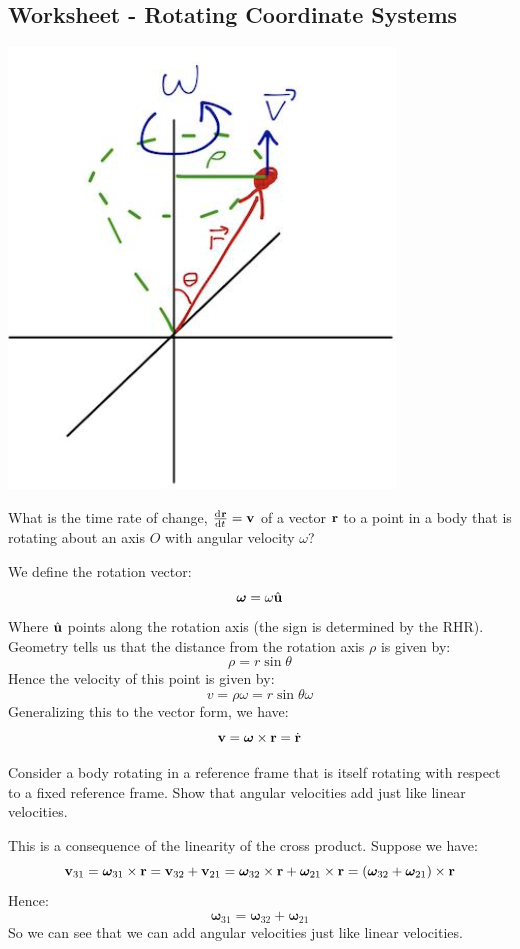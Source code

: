 \subsection{Worksheet - Rotating Coordinate Systems}
\begin{center}
    \includegraphics[scale=0.75]{Lecture-15/w15-img1.png}
\end{center}
\begin{p}
What is the time rate of change, $\od{\v{r}}{t} = \v{v}$ of a vector $\mathbf{r}$ to a point in a body that is rotating about an axis $O$ with angular velocity $\omega$?
\end{p}
\begin{s}
We define the rotation vector:
\[\bm{\omega} = \omega\hat{\mathbf{u}}\]
Where $\hat{\mathbf{u}}$ points along the rotation axis (the sign is determined by the RHR). Geometry tells us that the distance from the rotation axis $\rho$ is given by:
\[\rho = r\sin\theta\]
Hence the velocity of this point is given by:
\[v = \rho\omega = r\sin\theta\omega\]
Generalizing this to the vector form, we have:
\[\mathbf{v} = \bm{\omega} \times \mathbf{r} = \dot{\mathbf{r}}\]
\end{s}

\begin{p}
Consider a body rotating in a reference frame that is itself rotating with respect to a fixed reference frame. Show that angular velocities add just like linear velocities.
\end{p}
\begin{s}
This is a consequence of the linearity of the cross product. Suppose we have:
\[\mathbf{v}_{31} = \bm{\omega}_{31}\times \mathbf{r} = \mathbf{v}_{32} + \mathbf{v}_{21} = \bm{\omega}_{32}\times \mathbf{r} + \bm{\omega}_{21}\times \mathbf{r} = (\bm{\omega}_{32} + \bm{\omega}_{21})\times \mathbf{r}\]
Hence:
\[\bm{\omega}_{31} = \bm{\omega}_{32} + \bm{\omega}_{21}\]
So we can see that we can add angular velocities just like linear velocities.
\end{s}

